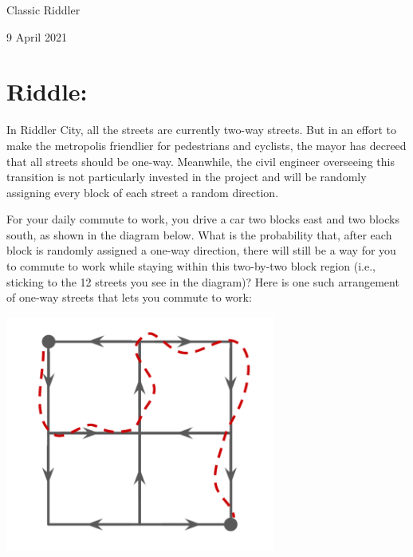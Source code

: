 \documentclass{article}
\begin{document}
\pagestyle{empty} %

\begin{center}
{\LARGE Classic Riddler}

\vspace{0.15in}

{\Large 9 April 2021}
\end{center}


\section*{Riddle:}

In Riddler City, all the streets are currently two-way streets.
But in an effort to make the metropolis friendlier for pedestrians and cyclists, the mayor has decreed that all streets should be one-way.
Meanwhile, the civil engineer overseeing this transition is not particularly invested in the project and will be randomly assigning every block of each street a random direction.

For your daily commute to work, you drive a car two blocks east and two blocks south, as shown in the diagram below.
What is the probability that, after each block is randomly assigned a one-way direction, there will still be a way for you to commute to work while staying within this two-by-two block region (i.e., sticking to the 12 streets you see in the diagram)?
Here is one such arrangement of one-way streets that lets you commute to work:

\vspace{0.1in}
\begin{center}
\includegraphics[width=3.5in]{streets.png}
\end{center}
\vspace{0.1in}
\end{document}
